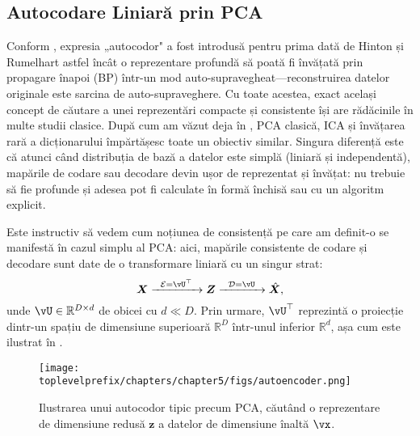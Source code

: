 \documentclass[../../book-main_ro.tex]{subfiles}
\begin{document}
\subsection{Autocodare Liniară prin PCA}
Conform \cite{Baldi2011}, expresia „autocodor" a fost introdusă pentru prima dată
de Hinton și Rumelhart \cite{Rumelhart1986} astfel încât o
reprezentare profundă să poată fi învățată prin propagare înapoi (BP) într-un mod auto-supravegheat---reconstruirea datelor originale este sarcina de auto-supraveghere. Cu toate acestea, exact același concept de căutare a unei reprezentări compacte și consistente își are rădăcinile în multe studii clasice. După cum am văzut deja în , PCA clasică, ICA și învățarea rară a dicționarului împărtășesc toate un obiectiv similar. Singura diferență este că atunci când distribuția de bază a datelor este simplă (liniară și
independentă), mapările de codare sau decodare devin ușor de reprezentat și
învățat: nu trebuie să fie profunde și adesea pot fi calculate în formă închisă sau
cu un algoritm explicit.

Este instructiv să vedem cum noțiunea de consistență pe care am
definit-o se manifestă în cazul simplu al PCA:
aici, mapările consistente de codare și decodare sunt date de o transformare
liniară cu un singur strat:
\begin{equation}
  \X \xrightarrow{\hspace{2mm} \mathcal{E} = \vU^\top \hspace{2mm}}
  \Z \xrightarrow{\hspace{2mm} \mathcal{D} = \vU \hspace{2mm}}   \hat{\X},
  \label{eqn:autoencoding-PCA-2}
\end{equation}
unde $\vU \in \mathbb{R}^{D\times d}$ de obicei cu $d\ll D$. Prin urmare,
$\vU^\top $ reprezintă o proiecție dintr-un spațiu de dimensiune superioară
$\mathbb{R}^{D}$ într-unul inferior $\mathbb{R}^{d}$, așa cum este ilustrat în
.
\begin{figure}
  \centering \texttt{[image: \\toplevelprefix/chapters/chapter5/figs/autoencoder.png]}
  \caption{Ilustrarea unui autocodor tipic precum PCA, căutând
  o reprezentare de dimensiune redusă $\bm{z}$ a datelor de dimensiune înaltă $\vx$.}
  \label{fig:AE}
\end{figure}
\end{document}
